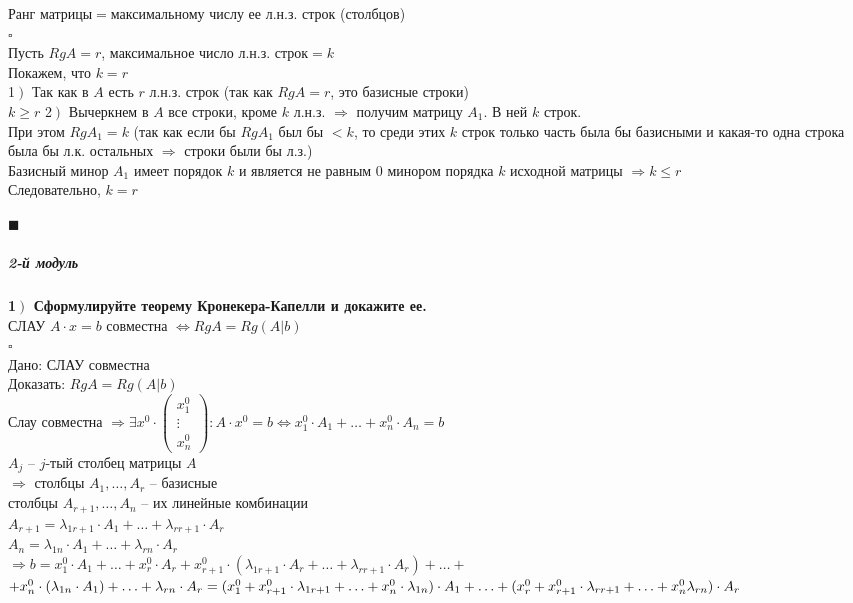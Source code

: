 \documentclass[a4paper,12pt]{article}
\newcommand*{\hm}[1]{#1\nobreak\discretionary{}
	{\hbox{$\mathsurround=0pt #1$}}{}}
\begin{document}
Ранг матрицы$=$максимальному числу ее л.н.з. строк (столбцов)\\
$\square$\\
Пусть $RgA=r$, максимальное число л.н.з. строк$=k$\\
Покажем, что $k=r$\\
1$\left.\right)$ Так как в $A$ есть $r$ л.н.з. строк (так как $RgA=r$, это базисные строки)\\
$k\geq r$
2$\left.\right)$ Вычеркнем в $A$ все строки, кроме $k$ л.н.з. $\Rightarrow$ получим матрицу $A_1$. В ней $k$ строк.\\
При этом $RgA_1=k$ (так как если бы $RgA_1$ был бы $<k$, то среди этих $k$ строк только часть была бы базисными и какая-то одна строка была бы л.к. остальных $\Rightarrow$ строки были бы л.з.)\\
Базисный минор $A_1$ имеет порядок $k$ и является не равным 0 минором порядка $k$ исходной матрицы $\Rightarrow k\leq r$\\
Следовательно, $k=r$
\begin{flushright}
	$\blacksquare$
\end{flushright}\newpage
\subparagraph{2-й модуль}
\textbf{1$\left.\right)$ Сформулируйте теорему Кронекера-Капелли и докажите ее.}\\
СЛАУ $A\cdot x=b$ совместна $\Leftrightarrow RgA=Rg(A|b)$\\
$\square$\\
Дано: СЛАУ совместна\\
Доказать: $RgA=Rg(A|b)$\\
Слау совместна $\Rightarrow\exists x^0\cdot\begin{pmatrix}
x_1^0\\
\vdots\\
x_n^0
\end{pmatrix}: A\cdot x^0=b\Leftrightarrow x_1^0\cdot A_1+\ldots+x_n^0\cdot A_n=b$\\
$A_j$ -- $j$-тый столбец матрицы $A$\\
$\Rightarrow$ столбцы $A_1, \ldots, A_r$ -- базисные\\
столбцы $A_{r+1},\ldots, A_n$ -- их линейные комбинации\\
$A_{r+1}=\lambda_{1r+1}\cdot A_1+\ldots+\lambda_{rr+1}\cdot A_r$\\
$A_n=\lambda_{1n}\cdot A_1+\ldots+\lambda_{rn}\cdot A_r$\\
$\Rightarrow b=x_1^0\cdot A_1+\ldots +x_r^0\cdot A_r+x^0_{r+1}\cdot(\lambda_{1r+1}\cdot A_r+\ldots+\lambda_{rr+1}\cdot A_r)+\ldots+$\\$+x_n^0\cdot(\lambda_{1n}\cdot A_1)+\ldots+\lambda_{rn}\cdot A_r=(x_1^0+x_{r+1}^0\cdot \lambda_{1r+1}+\ldots+x_n^0\cdot \lambda_{1n})\cdot A_1\hm{+}\ldots+(x_r^0+x_{r+1}^0\cdot \lambda_{rr+1}+\ldots+x_n^0\lambda_{rn})\cdot A_r$\\
\end{document}

